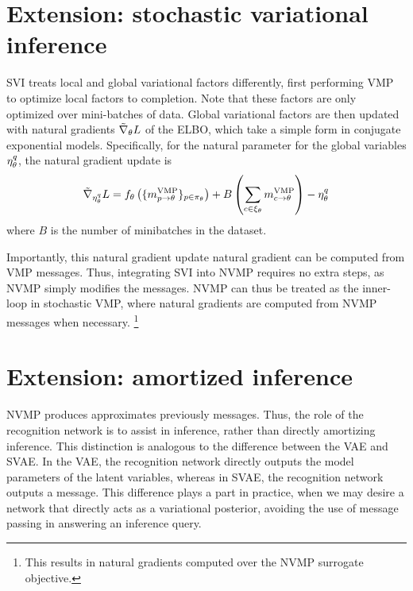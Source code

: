 \section{Extension: stochastic variational inference}
\label{sec:nvmpsvi}
SVI \citep{Hoffman2013} treats local and global variational factors differently,
first performing VMP to optimize local
factors to completion. Note that these factors are only
optimized over mini-batches of data.
Global variational factors are then updated
with natural gradients $\tilde{\nabla}_{\theta}L$ of the ELBO, 
which take a simple form in conjugate exponential models. Specifically,
for the natural parameter for the global variables
$\eta_{\theta}^q$,
the natural gradient update is
\begin{equation}
    \tilde{\nabla}_{\eta^q_{\theta}} L =  f_{\theta}\left(\{m^{\text{VMP}}_{p \rightarrow \theta}\}_{p \in \pi_{\theta}}\right) + B \left(\sum_{c \in \xi_{\theta}}m^{\text{VMP}}_{c \rightarrow \theta}\right) - \eta^q_{\theta}
\end{equation}
where $B$ is the number of minibatches in the dataset.

Importantly,
this natural gradient update natural gradient can be computed from VMP messages.
Thus, integrating SVI into NVMP requires no extra steps, 
as NVMP simply modifies the messages.
NVMP can thus be treated as the inner-loop
in stochastic VMP, where natural gradients are computed
from NVMP messages when necessary. \footnote{This results in natural gradients computed over the NVMP surrogate objective.}

\section{Extension: amortized inference}
\label{sec:amortizeddetail}
NVMP produces approximates previously messages. 
Thus, the role
of the recognition network is to assist in inference,
rather than directly amortizing inference.
This distinction is analogous to the difference
between the VAE and SVAE. In the VAE,
the recognition network directly outputs
the model parameters of the latent variables,
whereas in SVAE, the recognition network
outputs a message. 
This difference plays a part in practice, 
when we may desire a network that directly acts as a variational posterior,
avoiding the use of message passing in answering an inference query.

